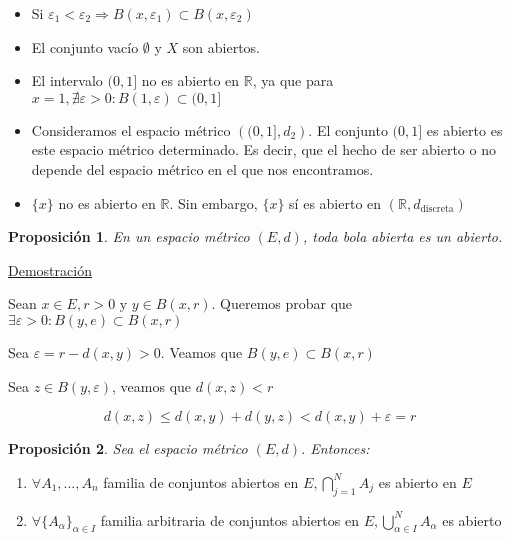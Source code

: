 \documentclass[10pt,a4paper,openright]{book}
\theoremstyle{break}
\newtheorem*{prop}{Proposición}
\begin{document}
\begin{itemize}
\item Si $\varepsilon_1 < \varepsilon_2 \Rightarrow B(x,\varepsilon_1) \subset B(x,\varepsilon_2)$

\item El conjunto vacío $\emptyset$ y $X$ son abiertos.

\item El intervalo $(0,1]$ no es abierto en $\mathbb{R}$, ya que para $x=1, \nexists \varepsilon > 0 : B(1,\varepsilon) \subset (0,1]$

\item Consideramos el espacio métrico $\left( (0,1], d_2 \right)$. El conjunto $(0,1]$ es abierto es este espacio métrico determinado. Es decir, que el hecho de ser abierto o no depende del espacio métrico en el que nos encontramos.

\item $\{x\}$ no es abierto en $\mathbb{R}$. Sin embargo, $\{x\}$ sí es abierto en $(\mathbb{R}, d_{\mbox{discreta}})$

\end{itemize}


\begin{prop}

En un espacio métrico $(E,d)$, toda bola abierta es un abierto.

\end{prop}
\underline{Demostración}

Sean $x \in E, r>0 \mbox{ y } y \in B(x,r)$. Queremos probar que $\exists \varepsilon > 0 : B(y,e) \subset B(x,r)$

Sea $\varepsilon = r - d(x,y) > 0$. Veamos que $B(y,e) \subset B(x,r)$

Sea $z \in B(y, \varepsilon)$, veamos que $d(x,z) < r$

$$d(x,z) \leq d(x,y) + d(y,z) < d(x,y) + \varepsilon = r$$


\begin{prop}
Sea el espacio métrico $(E,d)$. Entonces:
\end{prop}
\begin{enumerate}
\item $\forall A_1, \ldots, A_n$ familia de conjuntos abiertos en $E, \displaystyle\bigcap_{j=1}^N A_j$ es abierto en $E$

\item $\forall \{A_\alpha\}_{\alpha \in I}$ familia arbitraria de conjuntos abiertos en $E, \displaystyle \bigcup_{\alpha \in I}^N A_\alpha$ es abierto 
\end{enumerate}
\end{document}
